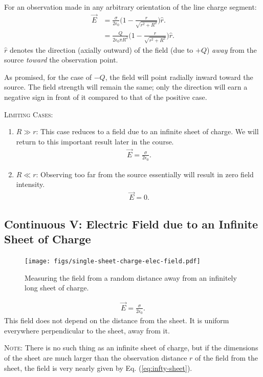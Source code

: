 \documentclass[12pt,b4paper]{article}
\begin{document}
For an observation made in any arbitrary orientation of the line charge segment:
\begin{align}
    \vec{E}&=\frac{\sigma}{2\epsilon_0}\bigg(1-\frac{r}{\sqrt{r^2+R^2}}\bigg)\hat{r}.\\
    &=\frac{Q}{2\epsilon_0\pi R^2}\bigg(1-\frac{r}{\sqrt{r^2+R^2}}\bigg)\hat{r}.
\end{align}
$\hat{r}$ denotes the direction (axially outward) of the field (due to $+Q$) \textit{away} from the source \textit{toward} the observation point.

As promised, for the case of $-Q$, the field will point radially inward toward the source. The field strength will remain the same; only the direction will earn a negative sign in front of it compared to that of the positive case.

\textsc{Limiting Cases}: \begin{enumerate}
\itemsep0em 
    \item $R\gg r$: This case reduces to a field due to an infinite sheet of charge. We will return to this important result later in the course. 
    \begin{align}
    \vec{E} = \frac{\sigma}{2\epsilon_0}.
    \end{align}
    \item $R\ll r$: Observing too far from the source essentially will result in zero field intensity.
    \begin{align}
    \vec{E} = 0.
    \end{align}
\end{enumerate}
\subsection{Continuous V: Electric Field due to an Infinite Sheet of Charge}
\begin{figure}[H]
    \centering
    \texttt{[image: figs/single-sheet-charge-elec-field.pdf]}
    \caption{Measuring the field from a random distance away from an infinitely long sheet of charge.}
    \label{fig:single-sheet-charge-elec-field}
\end{figure}
\begin{align}
    \vec{E} = \frac{\sigma}{2\epsilon_0}.\label{eq:infty-sheet}
\end{align}
This field does not depend on the distance from the sheet. It is uniform everywhere perpendicular to the sheet, away from it.

\textsc{Note}: There is no such thing as an infinite sheet of charge, but if the dimensions of the sheet are much larger than the observation distance $r$ of the field from the sheet, the field is very nearly given by Eq. (\ref{eq:infty-sheet}).
\end{document}
